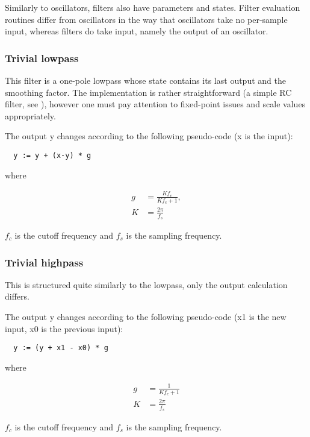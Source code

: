 \documentclass[10pt,a4paper,oneside]{article}
\begin{document}
Similarly to oscillators, filters also have parameters and states. Filter evaluation routines differ from oscillators in the way that oscillators take no per-sample input, whereas filters do take input, namely the output of an oscillator.

\subsubsection{Trivial lowpass}


This filter is a one-pole lowpass whose state contains its last output and the smoothing factor. The implementation is rather straightforward (a simple RC filter, see \cite{nostalgiaa}), however one must pay attention to fixed-point issues and scale values appropriately.

The output y changes according to the following pseudo-code (x is the input):

\begin{verbatim}
  y := y + (x-y) * g
\end{verbatim}

where

\[
\begin{split}
  g &= \frac{K f_c}{K f_c + 1},\\
  K &= \frac{2 \pi}{f_s}
\end{split}
\]

$f_c$ is the cutoff frequency and $f_s$ is the sampling frequency.

\subsubsection{Trivial highpass}

This is structured quite similarly to the lowpass, only the output calculation differs.

The output y changes according to the following pseudo-code (x1 is the new input, x0 is the previous input):

\begin{verbatim}
  y := (y + x1 - x0) * g
\end{verbatim}

where

\[
\begin{split}
  g &= \frac{1}{K f_c + 1}\\
  K &= \frac{2 \pi}{f_s}
\end{split}
\]

$f_c$ is the cutoff frequency and $f_s$ is the sampling frequency.
\end{document}
